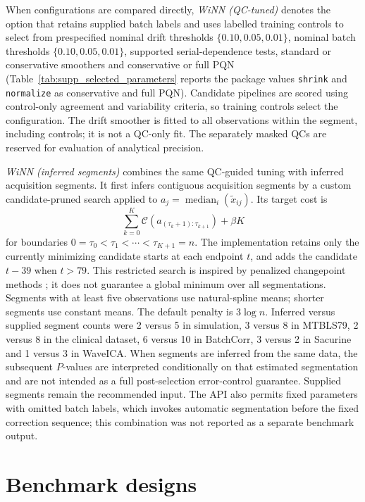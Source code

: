\documentclass[namedate,webpdf,modern,large,nocrop]{oup-authoring-template}
\begin{document}
When configurations are compared directly, \emph{WiNN (QC-tuned)} denotes the option that retains supplied batch labels and uses labelled training controls to select from prespecified nominal drift thresholds \(\{0.10,0.05,0.01\}\), nominal batch thresholds \(\{0.10,0.05,0.01\}\), supported serial-dependence tests, standard or conservative smoothers and conservative or full PQN (Table~\ref{tab:supp_selected_parameters} reports the package values \texttt{shrink} and \texttt{normalize} as conservative and full PQN). Candidate pipelines are scored using control-only agreement and variability criteria, so training controls select the configuration. The drift smoother is fitted to all observations within the segment, including controls; it is not a QC-only fit. The separately masked QCs are reserved for evaluation of analytical precision.

\emph{WiNN (inferred segments)} combines the same QC-guided tuning with inferred acquisition segments. It first infers contiguous acquisition segments by a custom candidate-pruned search applied to \(a_j=\operatorname{median}_{i}(\widetilde x_{ij})\). Its target cost is
\[
\sum_{k=0}^{K}\mathcal C\!\left(a_{(\tau_k+1):\tau_{k+1}}\right)+\beta K
\]
for boundaries \(0=\tau_0<\tau_1<\cdots<\tau_{K+1}=n\). The implementation retains only the currently minimizing candidate starts at each endpoint \(t\), and adds the candidate \(t-39\) when \(t>79\). This restricted search is inspired by penalized changepoint methods \citep{Killick2012PELT}; it does not guarantee a global minimum over all segmentations. Segments with at least five observations use natural-spline means; shorter segments use constant means. The default penalty is \(3\log n\). Inferred versus supplied segment counts were 2 versus 5 in simulation, 3 versus 8 in MTBLS79, 2 versus 8 in the clinical dataset, 6 versus 10 in BatchCorr, 3 versus 2 in Sacurine and 1 versus 3 in WaveICA. When segments are inferred from the same data, the subsequent \(P\)-values are interpreted conditionally on that estimated segmentation and are not intended as a full post-selection error-control guarantee. Supplied segments remain the recommended input. The API also permits fixed parameters with omitted batch labels, which invokes automatic segmentation before the fixed correction sequence; this combination was not reported as a separate benchmark output.

\section{Benchmark designs}
\label{sec:supp_designs}
\end{document}
